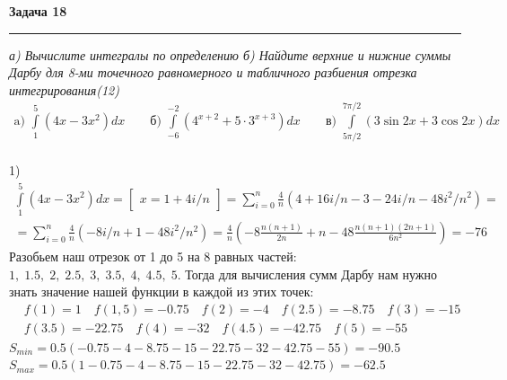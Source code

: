 \documentclass[a4paper,11pt]{article}
\begin{document}
\textbf{\large Задача 18}
\medskip\hrule\medskip
\textsl{а) Вычислите интегралы по определению б) Найдите верхние и нижние суммы Дарбу для 8-ми точечного равномерного и табличного разбиения отрезка интегрирования(12)} 
\begin{align*}
\text{a) } \int\limits_{1}^{5} (4x - 3x^2)dx \qquad
\text{б) } \int\limits_{-6}^{-2} (4^{x + 2} + 5 \cdot 3^{x + 3})dx \qquad
\text{в) } \int\limits_{5\pi/2}^{7\pi/2} (3\sin 2x + 3\cos 2x)dx 
\end{align*} \\
1)
\begin{gather*}
\int\limits_{1}^{5} (4x - 3x^2)dx = 
\begin{bmatrix} x = 1 + 4i/n \end{bmatrix} = 
\sum\limits_{i = 0}^{n} \frac4{n} (4 + 16i/n - 3 - 24i/n - 48i^2/n^2) =  \\[2pt]
= \sum\limits_{i = 0}^{n} \frac4{n} (-8i/n + 1 - 48i^2/n^2)
= \frac4{n} (-8\frac{n(n + 1)}{2n} + n - 48\frac{n(n + 1)(2n + 1)}{6n^2}) = -76
\end{gather*}
Разобьем наш отрезок от 1 до 5 на 8 равных частей: $ 1, \; 1.5, \; 2, \; 2.5, \; 3, \; 3.5, \; 4, \; 4.5, \; 5$. Тогда для вычисления сумм Дарбу нам нужно знать значение нашей функции в каждой из этих точек:
\begin{align*}
&f(1) = 1 \quad f(1,5) = -0.75 \quad f(2) = -4 \quad f(2.5) = -8.75 \quad f(3) = -15 \\ &f(3.5) = -22.75 \quad f(4) = -32 \quad f(4.5) = -42.75 \quad f(5) = -55
\end{align*}
$ S_{min} = 0.5(-0.75 - 4 - 8.75 - 15 - 22.75 - 32 - 42.75 - 55) = -90.5 $ \\
$ S_{max} = 0.5(1 -0.75 - 4 - 8.75 - 15 - 22.75 - 32 - 42.75) = -62.5 $ \\ \\[5pt]
\end{document}
